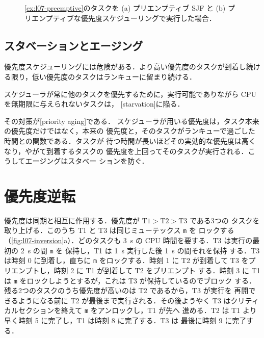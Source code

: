 \documentclass[../main.tex]{subfiles}
\begin{document}
\begin{figure}[htbp]
  \centering
  
  \caption{\cref{ex:l07-preemptive}のタスクを (a) プリエンプティブ SJF
    と (b) プリエンプティブな優先度スケジューリングで実行した場合．}
  \label{fig:l07-preemptive}
\end{figure}

\subsection{スタベーションとエージング}

優先度スケジューリングには危険がある．より高い優先度のタスクが到着し続け
る限り，低い優先度のタスクはランキューに留まり続ける．

\begin{definition}[スタベーション]
  スケジューラが常に他のタスクを優先するために，実行可能でありながら CPU
  を無期限に与えられないタスクは，%
  [starvation]に陥る．
\end{definition}

その対策が[priority aging]である．
スケジューラが用いる優先度は，タスク本来の優先度だけではなく，本来の
優先度と，そのタスクがランキューで過ごした時間との関数である．タスクが
待つ時間が長いほどその実効的な優先度は高くなり，やがて到着するタスクの
優先度を上回ってそのタスクが実行される．こうしてエージングはスタベー
ションを防ぐ．

\section{優先度逆転}
\label{sec:l07-inversion}

優先度は同期と相互に作用する．優先度が $\text{T1} > \text{T2} > \text{T3}$ である3つの
タスクを取り上げる．このうち T1 と T3 は同じミューテックス \texttt{m} を
ロックする（\cref{fig:l07-inversion}a）．どのタスクも \SI{3}{\second} の
CPU 時間を要する．T3 は実行の最初の \SI{2}{\second} の間 \texttt{m} を
保持し，T1 は \SI{1}{\second} 実行した後 \SI{1}{\second} の間それを保持
する．T3 は時刻 0 に到着し，直ちに \texttt{m} をロックする．時刻 1 に T2
が到着して T3 をプリエンプトし，時刻 2 に T1 が到着して T2 をプリエンプト
する．時刻 3 に T1 は
\texttt{m} をロックしようとするが，これは T3 が保持しているのでブロック
する．残る2つのタスクのうち優先度が高いのは T2 であるから，T3 が実行を
再開できるようになる前に T2 が最後まで実行される．その後ようやく
T3 はクリティカルセクションを終えて \texttt{m} をアンロックし，T1 が先へ
進める．T2 は T1 より早く時刻 5 に完了し，T1 は時刻 8 に完了する．T3 は
最後に時刻 9 に完了する．
\end{document}
